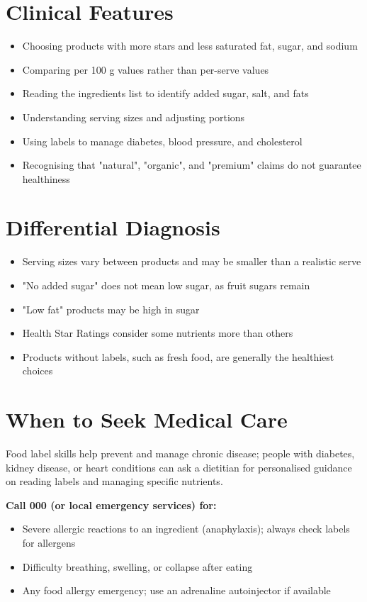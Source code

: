 \section*{Clinical Features}
\begin{itemize}
    \item Choosing products with more stars and less saturated fat, sugar, and sodium
    \item Comparing per 100 g values rather than per-serve values
    \item Reading the ingredients list to identify added sugar, salt, and fats
    \item Understanding serving sizes and adjusting portions
    \item Using labels to manage diabetes, blood pressure, and cholesterol
    \item Recognising that "natural", "organic", and "premium" claims do not guarantee healthiness
\end{itemize}

\section*{Differential Diagnosis}
\begin{itemize}
    \item Serving sizes vary between products and may be smaller than a realistic serve
    \item "No added sugar" does not mean low sugar, as fruit sugars remain
    \item "Low fat" products may be high in sugar
    \item Health Star Ratings consider some nutrients more than others
    \item Products without labels, such as fresh food, are generally the healthiest choices
\end{itemize}

\section*{When to Seek Medical Care}
Food label skills help prevent and manage chronic disease; people with diabetes, kidney disease, or heart conditions can ask a dietitian for personalised guidance on reading labels and managing specific nutrients.

\textbf{Call 000 (or local emergency services) for:}
\begin{itemize}
    \item Severe allergic reactions to an ingredient (anaphylaxis); always check labels for allergens
    \item Difficulty breathing, swelling, or collapse after eating
    \item Any food allergy emergency; use an adrenaline autoinjector if available
\end{itemize}

